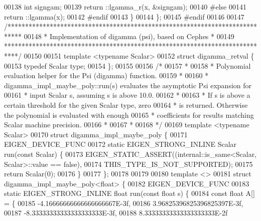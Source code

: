 \begin{DoxyCode}
00138     \textcolor{keywordtype}{int} signgam;
00139     return ::lgamma\_r(x, &signgam);
00140 \textcolor{preprocessor}{#else}
00141     return ::lgamma(x);
00142 \textcolor{preprocessor}{#endif}
00143   \}
00144 \};
00145 \textcolor{preprocessor}{#endif}
00146 
00147 \textcolor{comment}{/****************************************************************************}
00148 \textcolor{comment}{ * Implementation of digamma (psi), based on Cephes                         *}
00149 \textcolor{comment}{ ****************************************************************************/}
00150 
00151 \textcolor{keyword}{template} <\textcolor{keyword}{typename} Scalar>
00152 \textcolor{keyword}{struct }digamma\_retval \{
00153   \textcolor{keyword}{typedef} Scalar type;
00154 \};
00155 
00156 \textcolor{comment}{/*}
00157 \textcolor{comment}{ *}
00158 \textcolor{comment}{ * Polynomial evaluation helper for the Psi (digamma) function.}
00159 \textcolor{comment}{ *}
00160 \textcolor{comment}{ * digamma\_impl\_maybe\_poly::run(s) evaluates the asymptotic Psi expansion for}
00161 \textcolor{comment}{ * input Scalar s, assuming s is above 10.0.}
00162 \textcolor{comment}{ *}
00163 \textcolor{comment}{ * If s is above a certain threshold for the given Scalar type, zero}
00164 \textcolor{comment}{ * is returned.  Otherwise the polynomial is evaluated with enough}
00165 \textcolor{comment}{ * coefficients for results matching Scalar machine precision.}
00166 \textcolor{comment}{ *}
00167 \textcolor{comment}{ *}
00168 \textcolor{comment}{ */}
00169 \textcolor{keyword}{template} <\textcolor{keyword}{typename} Scalar>
00170 \textcolor{keyword}{struct }digamma\_impl\_maybe\_poly \{
00171   EIGEN\_DEVICE\_FUNC
00172   \textcolor{keyword}{static} EIGEN\_STRONG\_INLINE Scalar run(\textcolor{keyword}{const} Scalar) \{
00173     EIGEN\_STATIC\_ASSERT((internal::is\_same<Scalar, Scalar>::value == \textcolor{keyword}{false}),
00174                         THIS\_TYPE\_IS\_NOT\_SUPPORTED);
00175     \textcolor{keywordflow}{return} Scalar(0);
00176   \}
00177 \};
00178 
00179 
00180 \textcolor{keyword}{template} <>
00181 \textcolor{keyword}{struct }digamma\_impl\_maybe\_poly<float> \{
00182   EIGEN\_DEVICE\_FUNC
00183   \textcolor{keyword}{static} EIGEN\_STRONG\_INLINE \textcolor{keywordtype}{float} run(\textcolor{keyword}{const} \textcolor{keywordtype}{float} s) \{
00184     \textcolor{keyword}{const} \textcolor{keywordtype}{float} A[] = \{
00185       -4.16666666666666666667E-3f,
00186       3.96825396825396825397E-3f,
00187       -8.33333333333333333333E-3f,
00188       8.33333333333333333333E-2f

\end{DoxyCode}
